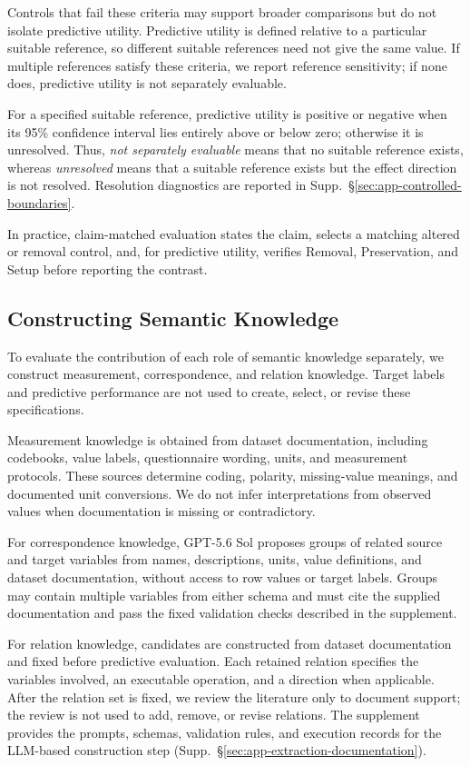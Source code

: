 \documentclass{article} %
\newcommand{\supp}[1]{\textnormal{Supp.~#1}}
\begin{document}
Controls that fail these criteria may support broader comparisons but do not isolate predictive utility.
Predictive utility is defined relative to a particular suitable reference, so different suitable references need not give the same value.
If multiple references satisfy these criteria, we report reference sensitivity; if none does, predictive utility is not separately evaluable.

For a specified suitable reference, predictive utility is positive or negative when its 95\% confidence interval lies entirely above or below zero; otherwise it is unresolved.
Thus, \emph{not separately evaluable} means that no suitable reference exists, whereas \emph{unresolved} means that a suitable reference exists but the effect direction is not resolved.
Resolution diagnostics are reported in \supp{\S\ref{sec:app-controlled-boundaries}}.

In practice, claim-matched evaluation states the claim, selects a matching altered or removal control, and, for predictive utility, verifies Removal, Preservation, and Setup before reporting the contrast.

\subsection{Constructing Semantic Knowledge}
\label{sec:knowledge_construction}

To evaluate the contribution of each role of semantic knowledge separately, we construct measurement, correspondence, and relation knowledge.
Target labels and predictive performance are not used to create, select, or revise these specifications.

Measurement knowledge is obtained from dataset documentation, including codebooks, value labels, questionnaire wording, units, and measurement protocols.
These sources determine coding, polarity, missing-value meanings, and documented unit conversions.
We do not infer interpretations from observed values when documentation is missing or contradictory.

For correspondence knowledge, GPT-5.6 Sol proposes groups of related source and target variables from names, descriptions, units, value definitions, and dataset documentation, without access to row values or target labels.
Groups may contain multiple variables from either schema and must cite the supplied documentation and pass the fixed validation checks described in the supplement.

For relation knowledge, candidates are constructed from dataset documentation and fixed before predictive evaluation.
Each retained relation specifies the variables involved, an executable operation, and a direction when applicable.
After the relation set is fixed, we review the literature only to document support; the review is not used to add, remove, or revise relations.
The supplement provides the prompts, schemas, validation rules, and execution records for the LLM-based construction step (\supp{\S\ref{sec:app-extraction-documentation}}).
\end{document}
